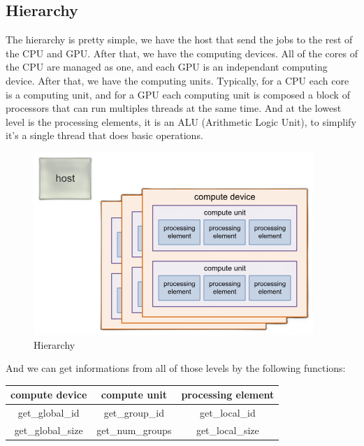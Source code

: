 \documentclass[12pt, openany]{report}
\theoremstyle{definition}
\begin{document}
\subsection{Hierarchy}
The hierarchy is pretty simple, we have the host that send the jobs to the rest of the CPU and GPU. After that, we have the computing devices. All of the cores of the CPU are managed as one, and each GPU is an independant computing device. After that, we have the computing units. Typically, for a CPU each core is a computing unit, and for a GPU each computing unit is composed a block of processors that can run multiples threads at the same time. And at the lowest level is the processing elements, it is an ALU (Arithmetic Logic Unit), to simplify it's a single thread that does basic operations.\\
\begin{figure}[H]
	\centering
	\includegraphics[width=0.8\linewidth]{img/hierarchy.png}
	\caption{Hierarchy}
	\label{fig:Hierarchy}
\end{figure}
And we can get informations from all of those levels by the following functions:
\begin{center}
	\begin{tabular}{|c|c|c|}
		\hline
		compute device & compute unit & processing element \\
		\hline
		get\_global\_id & get\_group\_id & get\_local\_id \\
		\hline
		get\_global\_size & get\_num\_groups & get\_local\_size \\
		\hline
	\end{tabular}
\end{center}
\end{document}
